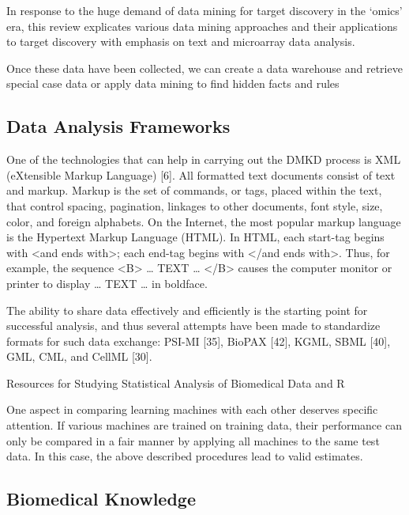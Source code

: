 \documentclass[10pt,a4paper]{article}
\begin{document}
	In response to the huge demand of data mining for target discovery in the ‘omics’ era, this review explicates various data mining approaches and their applications to target discovery with emphasis on text and microarray data analysis. \cite{YANG2012S16}
	
	Once these data have been collected, we
	can create a data warehouse and retrieve
	special case data or apply data mining to
	find hidden facts and rules \cite{bellazzi2011data}
	
	\subsection{Data Analysis Frameworks}
	
	One of the technologies that can help in carrying out the DMKD process is XML (eXtensible Markup Language) [6]. All formatted text documents consist of text and markup. Markup is the set of commands, or tags, placed within the text, that control spacing, pagination, linkages to other documents, font style, size, color, and foreign alphabets. On the Internet, the most popular markup language is the Hypertext Markup Language (HTML). In HTML, each start-tag begins with <and ends with>; each end-tag begins with </and ends with>. Thus, for example, the sequence <B> … TEXT … </B> causes the computer monitor or printer to display … TEXT … in boldface. \cite{CIOS20021}
	
	The ability to share data effectively and efficiently is the starting point for successful
	analysis, and thus several attempts have been made to standardize formats for such
	data exchange: PSI-MI [35], BioPAX [42], KGML, SBML [40], GML, CML, and
	CellML [30]. \cite{Otasek2014}
	
	Resources for Studying Statistical Analysis
	of Biomedical Data and R \cite{Kobayashi2014}
	
	One aspect in comparing learning machines
	with each other deserves specific attention.
	If various machines are trained on
	training data, their performance can only
	be compared in a fair manner by applying
	all machines to the same test data. In this
	case, the above described procedures lead
	to valid estimates. \cite{bellazzi2011data}
	
	\subsection{Biomedical Knowledge}
	
\end{document}

